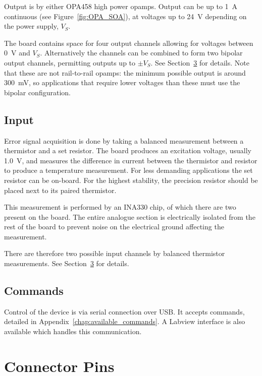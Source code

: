 \documentclass[11pt]{report}
\newcommand{\VExcite}{1.0}
\begin{document}
Output is by either OPA458 high power opamps. Output can be up to \SI{1}{\A} continuous (see Figure~\ref{fig:OPA_SOA}), at voltages up to \SI{24}{\volt} depending on the power supply, $V_S$. 

The board contains space for four output channels allowing for voltages between \SI{0}{\volt} and $V_S$. Alternatively the channels can be combined to form two bipolar output channels, permitting outputs up to $\pm V_S$. See Section~\ref{sec:connector_pins} for details. Note that these are not rail-to-rail opamps: the minimum possible output is around \SI{300}{\milli\volt}, so applications that require lower voltages than these must use the bipolar configuration. 

\section{Input}

Error signal acquisition is done by taking a balanced measurement between a thermistor and a set resistor. The board produces an excitation voltage, usually \SI{\VExcite}{\volt}, and measures the difference in current between the thermistor and resistor to produce a temperature measurement. For less demanding applications the set resistor can be on-board. For the highest stability, the precision resistor should be placed next to its paired thermistor. 

This measurement is performed by an INA330 chip, of which there are two present on the board. The entire analogue section is electrically isolated from the rest of the board to prevent noise on the electrical ground affecting the measurement. 

There are therefore two possible input channels by balanced thermistor measurements. See Section~\ref{sec:connector_pins} for details. 

\section{Commands}

Control of the device is via serial connection over USB. It accepts commands, detailed in Appendix~\ref{chap:available_commands}. A Labview interface is also available which handles this communication. 

\chapter{Connector Pins} %
\label{sec:connector_pins}
\end{document}
